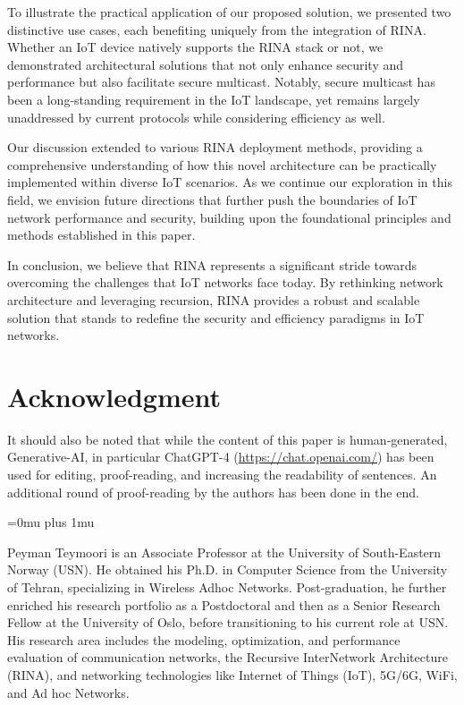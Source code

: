 \documentclass{ieeeaccess}
\begin{document}
To illustrate the practical application of our proposed solution, we presented two distinctive use cases, each benefiting uniquely from the integration of RINA. Whether an IoT device natively supports the RINA stack or not, we demonstrated architectural solutions that not only enhance security and performance but also facilitate secure multicast. Notably, secure multicast has been a long-standing requirement in the IoT landscape, yet remains largely unaddressed by current protocols while considering efficiency as well.

Our discussion extended to various RINA deployment methods, providing a comprehensive understanding of how this novel architecture can be practically implemented within diverse IoT scenarios. As we continue our exploration in this field, we envision future directions that further push the boundaries of IoT network performance and security, building upon the foundational principles and methods established in this paper.

In conclusion, we believe that RINA represents a significant stride towards overcoming the challenges that IoT networks face today. By rethinking network architecture and leveraging recursion, RINA provides a robust and scalable solution that stands to redefine the security and efficiency paradigms in IoT networks.

\section*{Acknowledgment}
It should also be noted that while the content of this paper is human-generated, Generative-AI, in particular ChatGPT-4 (\underline{https://chat.openai.com/}) has been used for editing, proof-reading, and increasing the readability of sentences. An additional round of proof-reading by the authors has been done in the end.

\Urlmuskip=0mu plus 1mu\relax




\begin{IEEEbiography}{Peyman Teymoori} is an Associate Professor at the University of South-Eastern Norway (USN). He obtained his Ph.D. in Computer Science from the University of Tehran, specializing in Wireless Adhoc Networks. Post-graduation, he further enriched his research portfolio as a Postdoctoral and then as a Senior Research Fellow at the University of Oslo, before transitioning to his current role at USN. His research area includes the modeling, optimization, and performance evaluation of communication networks, the Recursive InterNetwork Architecture (RINA), and networking technologies like Internet of Things (IoT), 5G/6G, WiFi, and Ad hoc Networks.
\end{IEEEbiography}
\end{document}
